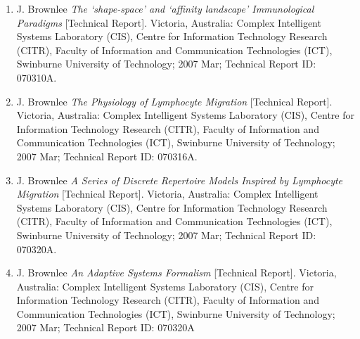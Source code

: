 \begin{enumerate}
	\item J. Brownlee \emph{The `shape-space' and `affinity landscape' Immunological Paradigms} [Technical Report]. Victoria, Australia: Complex Intelligent Systems Laboratory (CIS), Centre for Information Technology Research (CITR), Faculty of Information and Communication Technologies (ICT), Swinburne University of Technology; 2007 Mar; Technical Report ID: 070310A.
	\item J. Brownlee \emph{The Physiology of Lymphocyte Migration} [Technical Report]. Victoria, Australia: Complex Intelligent Systems Laboratory (CIS), Centre for Information Technology Research (CITR), Faculty of Information and Communication Technologies (ICT), Swinburne University of Technology; 2007 Mar; Technical Report ID: 070316A.
	\item J. Brownlee \emph{A Series of Discrete Repertoire Models Inspired by Lymphocyte Migration} [Technical Report]. Victoria, Australia: Complex Intelligent Systems Laboratory (CIS), Centre for Information Technology Research (CITR), Faculty of Information and Communication Technologies (ICT), Swinburne University of Technology; 2007 Mar; Technical Report ID: 070320A.
	\item J. Brownlee \emph{An Adaptive Systems Formalism} [Technical Report]. Victoria, Australia: Complex Intelligent Systems Laboratory (CIS), Centre for Information Technology Research (CITR), Faculty of Information and Communication Technologies (ICT), Swinburne University of Technology; 2007 Mar; Technical Report ID: 070320A
	

\end{enumerate}
